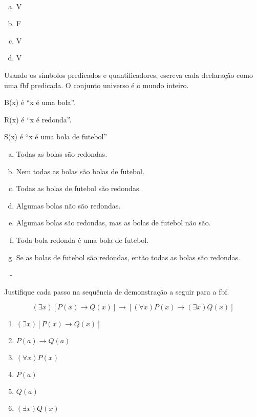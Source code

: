 \documentclass[a4paper, 12pt, addpoints]{exam}
\begin{document}
\begin{questions}
  \begin{resp}~
    \begin{multicols}{4}
      \begin{enumerate}[a)]
        \item V
        \item F
        \item V
        \item V
      \end{enumerate}
    \end{multicols}
  \end{resp}

  \question  Usando os símbolos predicados e quantificadores, escreva cada declaração como uma fbf predicada. O conjunto universo é o mundo inteiro.

  B(x) é “x é uma bola”.

  R(x) é “x é redonda”.

  S(x) é “x é uma bola de futebol”

  \begin{enumerate}[a)]
    \item Todas as bolas são redondas.
    \item Nem todas as bolas são bolas de futebol.
    \item Todas as bolas de futebol são redondas.
    \item Algumas bolas não são redondas.
    \item Algumas bolas são redondas, mas as bolas de futebol não são.
    \item Toda bola redonda é uma bola de futebol.
    \item Se as bolas de futebol são redondas, então todas as bolas são redondas.
  \end{enumerate}

  \begin{resp}~
    - 
  \end{resp}

  \question  Justifique cada passo na sequência de demonstração a seguir para a fbf.

  \[ (\exists x)[P(x) \rightarrow Q(x)] \rightarrow [(\forall x)P(x) \rightarrow (\exists x)Q(x)] \] 

  \begin{enumerate}[1.]
    \item $(\exists x)[P(x) \rightarrow Q(x)]$
    \item $P(a) \rightarrow Q(a) $
    \item $(\forall x)P(x)$
    \item $P(a)$
    \item $Q(a)$
    \item $(\exists x)Q(x)$
  \end{enumerate}


\end{questions}
\end{document}
